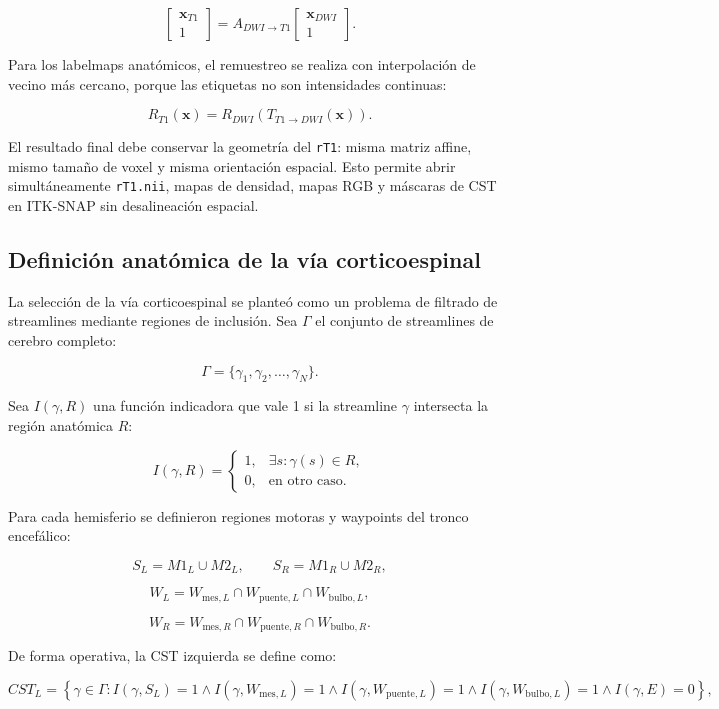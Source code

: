 \documentclass[12pt,a4paper]{article}
\begin{document}
\[
\begin{bmatrix}
\mathbf{x}_{T1}\\1
\end{bmatrix}
=
A_{DWI\rightarrow T1}
\begin{bmatrix}
\mathbf{x}_{DWI}\\1
\end{bmatrix}.
\]

Para los labelmaps anatómicos, el remuestreo se realiza con interpolación de vecino más cercano, porque las etiquetas no son intensidades continuas:

\[
R_{T1}(\mathbf{x})=
R_{DWI}\left(T_{T1\rightarrow DWI}(\mathbf{x})\right).
\]

El resultado final debe conservar la geometría del \texttt{rT1}: misma matriz affine, mismo tamaño de voxel y misma orientación espacial. Esto permite abrir simultáneamente \texttt{rT1.nii}, mapas de densidad, mapas RGB y máscaras de CST en ITK-SNAP sin desalineación espacial.

\subsection{Definición anatómica de la vía corticoespinal}

La selección de la vía corticoespinal se planteó como un problema de filtrado de streamlines mediante regiones de inclusión. Sea $\Gamma$ el conjunto de streamlines de cerebro completo:

\[
\Gamma=\{\gamma_1,\gamma_2,\ldots,\gamma_N\}.
\]

Sea $I(\gamma,R)$ una función indicadora que vale 1 si la streamline $\gamma$ intersecta la región anatómica $R$:

\[
I(\gamma,R)=
\begin{cases}
1, & \exists s: \gamma(s)\in R,\\
0, & \text{en otro caso}.
\end{cases}
\]

Para cada hemisferio se definieron regiones motoras y waypoints del tronco encefálico:

\[
S_L = M1_L\cup M2_L,
\qquad
S_R = M1_R\cup M2_R,
\]

\[
W_L = W_{\text{mes},L}\cap W_{\text{puente},L}\cap W_{\text{bulbo},L},
\]

\[
W_R = W_{\text{mes},R}\cap W_{\text{puente},R}\cap W_{\text{bulbo},R}.
\]

De forma operativa, la CST izquierda se define como:

\[
CST_L=
\left\{
\gamma\in\Gamma:
I(\gamma,S_L)=1
\land
I(\gamma,W_{\text{mes},L})=1
\land
I(\gamma,W_{\text{puente},L})=1
\land
I(\gamma,W_{\text{bulbo},L})=1
\land
I(\gamma,E)=0
\right\},
\]
\end{document}
